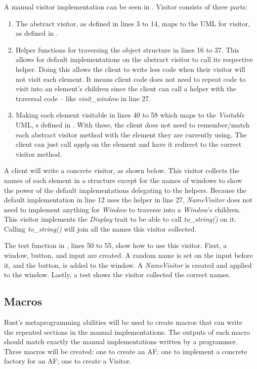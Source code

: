 A manual visitor implementation can be seen in .
Visitor consists of three parts:
\begin{enumerate}
	\item The abstract visitor, as defined in lines 3 to 14, maps to the UML for visitor, as defined in .
	\item Helper functions for traversing the object structure \cite{gamma_94_01} in lines 16 to 37.
	      This allows for default implementations on the abstract visitor to call its respective helper.
	      Doing this allows the client to write less code when their visitor will not visit each element.
	      It means client code does not need to repeat code to visit into an element's children since the client can call a helper with the traversal code -- like \textit{visit\_window} in line 27.
	\item Making each element visitable in lines 40 to 58 which maps to the \textit{Visitable} UML, s defined in .
	      With these, the client does not need to remember/match each abstract visitor method with the element they are currently using.
	      The client can just call \textit{apply} on the element and have it redirect to the correct visitor method.
\end{enumerate}

A client will write a concrete visitor, as shown below.
This visitor collects the names of each element in a structure except for the names of windows to show the power of the default implementations delegating to the helpers.
Because the default implementation in  line 12 uses the helper in line 27, \textit{NameVisitor} does not need to implement anything for \textit{Window} to traverse into a \textit{Window}'s children.
This visitor implements the \textit{Display} trait to be able to call \textit{to\_string()} on it.
Calling \textit{to\_string()} will join all the names this visitor collected.


The test function in , lines 50 to 55, show how to use this visitor.
First, a window, button, and input are created.
A random name is set on the input before it, and the button, is added to the window.
A \textit{NameVisitor} is created and applied to the window.
Lastly, a test shows the visitor collected the correct names.

\subsection{Macros}
Rust's metaprogramming abilities will be used to create macros that can write the repeated sections in the manual implementations.
The outputs of each macro should match exactly the manual implementations written by a programmer.
Three macros will be created: one to create an AF; one to implement a concrete factory for an AF; one to create a Visitor.

